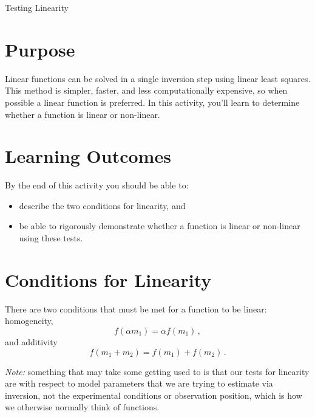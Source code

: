\begin{activity}{Testing Linearity}

\section*{Purpose}

Linear functions can be solved in a single inversion step using linear least squares.  This method is simpler, faster, and less computationally expensive, so when possible a linear function is preferred.  In this activity, you'll learn to determine whether a function is linear or non-linear.

\section*{Learning Outcomes}

By the end of this activity you should be able to:
\begin{itemize}
    \item describe the two conditions for linearity, and
    \item be able to rigorously demonstrate whether a function is linear or non-linear using these tests.
\end{itemize}

\section*{Conditions for Linearity}

There are two conditions that must be met for a function to be linear: homogeneity,
\[
    f(\alpha m_1) = \alpha f(m_1) \, ,
\]
and additivity
\[
    f(m_1 + m_2) = f(m_1) + f(m_2) \, .
\]

\emph{Note:} something that may take some getting used to is that our tests for linearity are with respect to model parameters that we are trying to estimate via inversion, not the experimental conditions or observation position, which is how we otherwise normally think of functions.

\end{activity}

